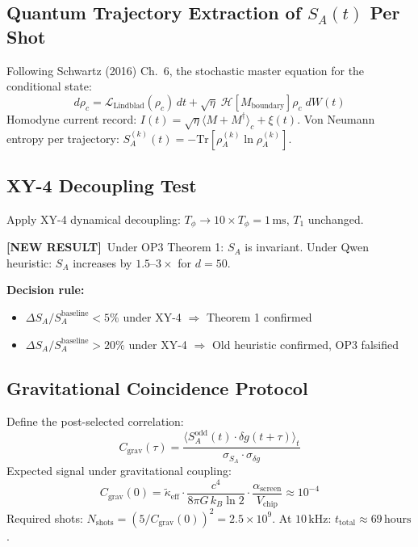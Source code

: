 \documentclass[11pt,letterpaper]{article}
\newcommand{\NEW}{\textcolor{newresult}{\textbf{[NEW RESULT]}}}
\newcommand{\SA}{S_A}
\newcommand{\asc}{\alpha_{\mathrm{screen}}}
\newcommand{\keff}{\tilde{\kappa}_{\mathrm{eff}}}
\newcommand{\Tphi}{T_\phi}
\newcommand{\Tone}{T_1}
\begin{document}
\subsection{Quantum Trajectory Extraction of $S_A(t)$ Per Shot}

Following Schwartz (2016) Ch.\ 6, the stochastic master equation for the conditional state:
\begin{equation}
  d\rho_c = \mathcal{L}_{\mathrm{Lindblad}}(\rho_c)\,dt + \sqrt{\eta}\;\mathcal{H}[M_{\mathrm{boundary}}]\rho_c\;dW(t)
\end{equation}
Homodyne current record: $I(t) = \sqrt{\eta}\langle M + M^\dagger\rangle_c + \xi(t)$.
Von Neumann entropy per trajectory: $\SA^{(k)}(t) = -\mathrm{Tr}[\rho_A^{(k)}\ln\rho_A^{(k)}]$.

\subsection{XY-4 Decoupling Test}

Apply XY-4 dynamical decoupling: $\Tphi \to 10\times\Tphi = 1\,\text{ms}$, $\Tone$ unchanged.

\NEW\ Under OP3 Theorem 1: $\SA$ is invariant. Under Qwen heuristic: $\SA$ increases by $1.5$--$3\times$ for $d = 50$.

\textbf{Decision rule:}
\begin{itemize}[nosep]
  \item $\Delta\SA/\SA^{\mathrm{baseline}} < 5\%$ under XY-4 $\Rightarrow$ Theorem 1 confirmed
  \item $\Delta\SA/\SA^{\mathrm{baseline}} > 20\%$ under XY-4 $\Rightarrow$ Old heuristic confirmed, OP3 falsified
\end{itemize}

\subsection{Gravitational Coincidence Protocol}

Define the post-selected correlation:
\begin{equation}
  C_{\mathrm{grav}}(\tau) = \frac{\langle \SA^{\mathrm{odd}}(t)\cdot\delta g(t+\tau)\rangle_t}{\sigma_{\SA}\cdot\sigma_{\delta g}}
  \label{eq:Cgrav}
\end{equation}
Expected signal under gravitational coupling:
\begin{equation}
  C_{\mathrm{grav}}(0) = \keff \cdot \frac{c^4}{8\pi G\,k_B\ln 2}\cdot\frac{\asc}{V_{\mathrm{chip}}} \approx 10^{-4}
\end{equation}
Required shots: $N_{\mathrm{shots}} = (5/C_{\mathrm{grav}}(0))^2 = 2.5\times 10^9$. At $10\,\text{kHz}$: $t_{\mathrm{total}} \approx 69\,\text{hours}$.
\end{document}
